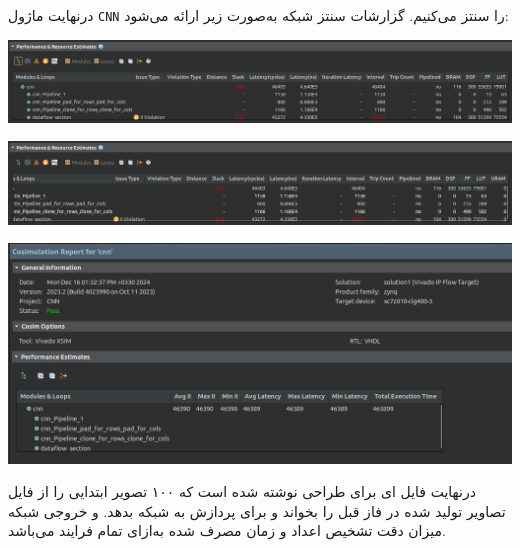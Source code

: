 \begin{qsolve}
	درنهایت ماژول \texttt{CNN} را سنتز می‌کنیم. گزارشات سنتز شبکه به‌صورت زیر ارائه می‌شود:
	
	\begin{center}
		\includegraphics*[width=1\linewidth]{pics/Synthesis_Result_1.png}
		\label{منابع مصرفی پس‌از سنتز (الف)}
	\end{center}
	
	
	\begin{center}
		\includegraphics*[width=1\linewidth]{pics/Synthesis_Result_2.png}
		\label{منابع مصرفی پس‌از سنتز (ب)}
	\end{center}
	
	
	\begin{center}
		\includegraphics*[width=1\linewidth]{pics/Synthesis_Result_3.png}
		\label{منابع مصرفی پس‌از سنتز (ج)}
	\end{center}
	
	
	درنهایت فایل  ای برای طراحی نوشته شده است که ۱۰۰ تصویر ابتدایی را از فایل تصاویر تولید شده در فاز قبل را بخواند و برای پردازش به شبکه بدهد. و خروجی شبکه میزان دقت تشخیص اعداد و زمان مصرف شده به‌ازای تمام فرایند می‌باشد.
\end{qsolve}
\newpage


